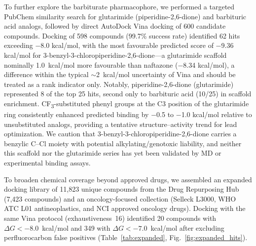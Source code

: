 \documentclass[10pt,letterpaper]{article}
\begin{document}
To further explore the barbiturate pharmacophore, we performed a targeted PubChem similarity search for glutarimide (piperidine-2,6-dione) and barbituric acid analogs, followed by direct AutoDock Vina docking of 600 candidate compounds. Docking of 598 compounds (99.7\% success rate) identified 62 hits exceeding $-$8.0 kcal/mol, with the most favourable predicted score of $-$9.36 kcal/mol for 3-benzyl-3-chloropiperidine-2,6-dione---a glutarimide scaffold nominally 1.0~kcal/mol more favourable than naftazone ($-$8.34 kcal/mol), a difference within the typical $\sim$2~kcal/mol uncertainty of Vina and should be treated as a rank indicator only. Notably, piperidine-2,6-dione (glutarimide) represented 8 of the top 25 hits, second only to barbituric acid (10/25) in scaffold enrichment. CF\textsubscript{3}-substituted phenyl groups at the C3 position of the glutarimide ring consistently enhanced predicted binding by $-$0.5 to $-$1.0 kcal/mol relative to unsubstituted analogs, providing a tentative structure--activity trend for lead optimization. We caution that 3-benzyl-3-chloropiperidine-2,6-dione carries a benzylic C--Cl moiety with potential alkylating/genotoxic liability, and neither this scaffold nor the glutarimide series has yet been validated by MD or experimental binding assays.

To broaden chemical coverage beyond approved drugs, we assembled an expanded docking library of 11,823 unique compounds from the Drug Repurposing Hub (7,423 compounds) and an oncology-focused collection (Selleck L3000, WHO ATC L01 antineoplastics, and NCI approved oncology drugs). Docking with the same Vina protocol (exhaustiveness~16) identified 20 compounds with $\Delta G < -8.0$~kcal/mol and 349 with $\Delta G < -7.0$~kcal/mol after excluding perfluorocarbon false positives (Table~\ref{tab:expanded}, Fig.~\ref{fig:expanded_hits}).
\end{document}
